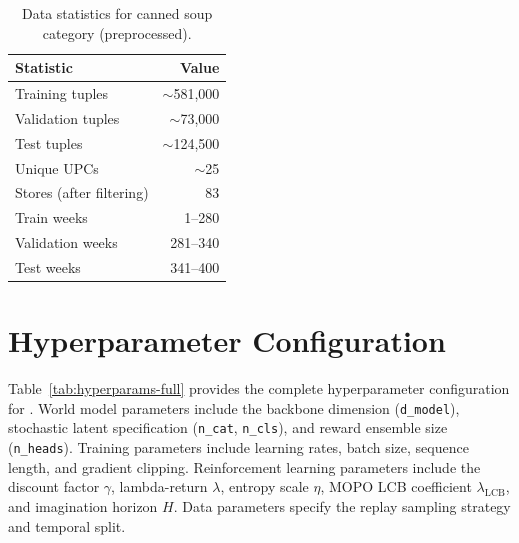 \begin{table}[h]
\centering
\caption{Data statistics for canned soup category (preprocessed).}
\label{tab:data-statistics}
\begin{tabular}{@{}lr@{}}
\toprule
\textbf{Statistic} & \textbf{Value} \\
\midrule
Training tuples & $\sim$581,000 \\
Validation tuples & $\sim$73,000 \\
Test tuples & $\sim$124,500 \\
Unique UPCs & $\sim$25 \\
Stores (after filtering) & 83 \\
Train weeks & 1--280 \\
Validation weeks & 281--340 \\
Test weeks & 341--400 \\
\bottomrule
\end{tabular}
\end{table}

\section{Hyperparameter Configuration}
\label{app:hyperparams}

Table~\ref{tab:hyperparams-full} provides the complete hyperparameter configuration for \dreamprice{}. World model parameters include the \mamba{} backbone dimension (\texttt{d\_model}), stochastic latent specification (\texttt{n\_cat}, \texttt{n\_cls}), and reward ensemble size (\texttt{n\_heads}). Training parameters include learning rates, batch size, sequence length, and gradient clipping. Reinforcement learning parameters include the discount factor $\gamma$, lambda-return $\lambda$, entropy scale $\eta$, MOPO LCB coefficient $\lambda_{\text{LCB}}$, and imagination horizon $H$. Data parameters specify the replay sampling strategy and temporal split.

